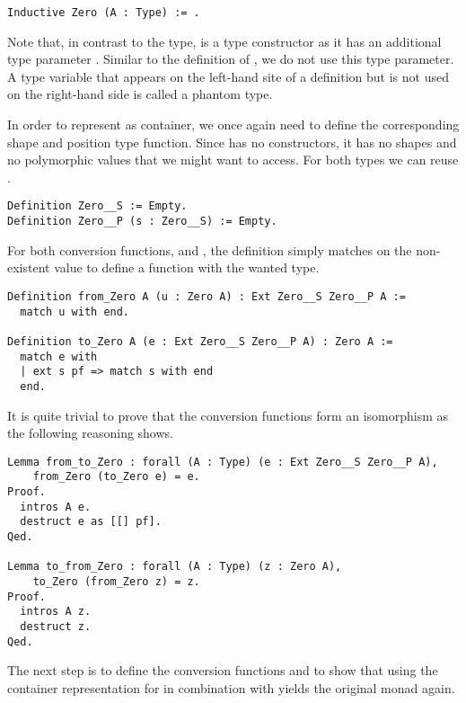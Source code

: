 \begin{verbatim}
Inductive Zero (A : Type) := .
\end{verbatim}

Note that, in contrast to the  type,  is a type constructor as it has an additional type parameter .
Similar to the definition of , we do not use this type parameter.
A type variable that appears on the left-hand site of a definition but is not used on the right-hand side is called a phantom type.

In order to represent  as container, we once again need to define the corresponding shape and position type function.
Since  has no constructors, it has no shapes and no polymorphic values that we might want to access.
For both types we can reuse .

\begin{verbatim}
Definition Zero__S := Empty.
Definition Zero__P (s : Zero__S) := Empty.
\end{verbatim}

For both conversion functions,  and , the definition simply matches on the non-existent value to define a function with the wanted type.

\begin{verbatim}
Definition from_Zero A (u : Zero A) : Ext Zero__S Zero__P A :=
  match u with end.

Definition to_Zero A (e : Ext Zero__S Zero__P A) : Zero A :=
  match e with
  | ext s pf => match s with end
  end.
\end{verbatim}

It is quite trivial to prove that the conversion functions form an isomorphism as the following reasoning shows.

\begin{verbatim}
Lemma from_to_Zero : forall (A : Type) (e : Ext Zero__S Zero__P A),
    from_Zero (to_Zero e) = e.
Proof.
  intros A e.
  destruct e as [[] pf].
Qed.

Lemma to_from_Zero : forall (A : Type) (z : Zero A),
    to_Zero (from_Zero z) = z.
Proof.
  intros A z.
  destruct z.
Qed.
\end{verbatim}

The next step is to define the conversion functions  and  to show that using the container representation for  in combination with  yields the original monad  again.

